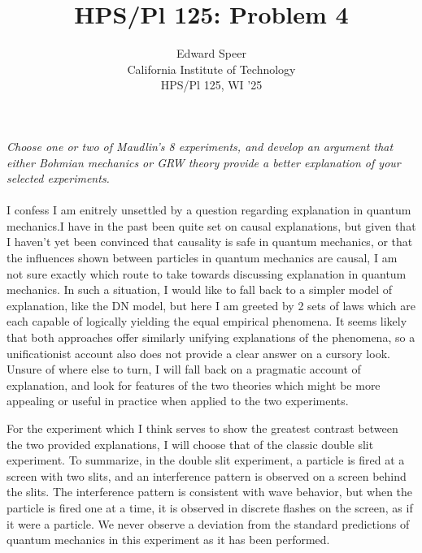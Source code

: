 \documentclass[11pt, a4paper]{article}
\title{HPS/Pl 125: Problem 4}
\author{%
  Edward Speer
  \\
  California Institute of Technology\\
  HPS/Pl 125, WI '25 \\
}
\date{\monthyeardate}
\begin{document}
\maketitle

\noindent \emph{Choose one or two of Maudlin's 8 experiments, and develop an 
argument that either Bohmian mechanics or GRW theory provide a better
explanation of your selected experiments.}
\\\hfill\\
I confess I am enitrely unsettled by a question regarding explanation in quantum
mechanics.I have in the past been quite set on causal explanations, but given 
that I haven't yet been convinced that causality is safe in quantum mechanics,
or that the influences shown between particles in quantum mechanics are causal,
I am not sure exactly which route to take towards discussing explanation in 
quantum mechanics. In such a situation, I would like to fall back to a simpler
model of explanation, like the DN model, but here I am greeted by 2 sets of laws
which are each capable of logically yielding the equal empirical phenomena. It
seems likely that both approaches offer similarly unifying explanations of the
phenomena, so a unificationist account also does not provide a clear answer on
a cursory look. Unsure of where else to turn, I will fall back on a pragmatic
account of explanation, and look for features of the two theories which might
be more appealing or useful in practice when applied to the two experiments.

For the experiment which I think serves to show the greatest contrast
between the two provided explanations, I will choose that of the classic double
slit experiment. To summarize, in the double slit experiment, a particle is
fired at a screen with two slits, and an interference pattern is observed on a
screen behind the slits. The interference pattern is consistent with wave
behavior, but when the particle is fired one at a time, it is observed in
discrete flashes on the screen, as if it were a particle. We never observe a
deviation from the standard predictions of quantum mechanics in this experiment
as it has been performed. 
\end{document}
